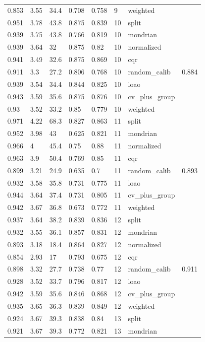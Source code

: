 \begin{tabular}{llllllll}
0.853 & 3.55 & 34.4 & 0.708 & 0.758 & 9 & weighted &  \\
0.951 & 3.78 & 43.8 & 0.875 & 0.839 & 10 & split &  \\
0.939 & 3.75 & 43.8 & 0.766 & 0.819 & 10 & mondrian &  \\
0.939 & 3.64 & 32 & 0.875 & 0.82 & 10 & normalized &  \\
0.941 & 3.49 & 32.6 & 0.875 & 0.869 & 10 & cqr &  \\
0.911 & 3.3 & 27.2 & 0.806 & 0.768 & 10 & random\_calib & 0.884 \\
0.939 & 3.54 & 34.4 & 0.844 & 0.825 & 10 & loao &  \\
0.943 & 3.59 & 35.6 & 0.875 & 0.876 & 10 & cv\_plus\_group &  \\
0.93 & 3.52 & 33.2 & 0.85 & 0.779 & 10 & weighted &  \\
0.971 & 4.22 & 68.3 & 0.827 & 0.863 & 11 & split &  \\
0.952 & 3.98 & 43 & 0.625 & 0.821 & 11 & mondrian &  \\
0.966 & 4 & 45.4 & 0.75 & 0.88 & 11 & normalized &  \\
0.963 & 3.9 & 50.4 & 0.769 & 0.85 & 11 & cqr &  \\
0.899 & 3.21 & 24.9 & 0.635 & 0.7 & 11 & random\_calib & 0.893 \\
0.932 & 3.58 & 35.8 & 0.731 & 0.775 & 11 & loao &  \\
0.944 & 3.64 & 37.4 & 0.731 & 0.805 & 11 & cv\_plus\_group &  \\
0.942 & 3.67 & 36.8 & 0.673 & 0.772 & 11 & weighted &  \\
0.937 & 3.64 & 38.2 & 0.839 & 0.836 & 12 & split &  \\
0.932 & 3.55 & 36.1 & 0.857 & 0.831 & 12 & mondrian &  \\
0.893 & 3.18 & 18.4 & 0.864 & 0.827 & 12 & normalized &  \\
0.854 & 2.93 & 17 & 0.793 & 0.675 & 12 & cqr &  \\
0.898 & 3.32 & 27.7 & 0.738 & 0.77 & 12 & random\_calib & 0.911 \\
0.928 & 3.52 & 33.7 & 0.796 & 0.817 & 12 & loao &  \\
0.942 & 3.59 & 35.6 & 0.846 & 0.868 & 12 & cv\_plus\_group &  \\
0.935 & 3.65 & 36.3 & 0.839 & 0.849 & 12 & weighted &  \\
0.924 & 3.67 & 39.3 & 0.838 & 0.84 & 13 & split &  \\
0.921 & 3.67 & 39.3 & 0.772 & 0.821 & 13 & mondrian &  \\

\end{tabular}
